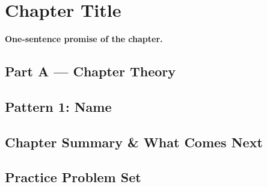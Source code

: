 %
\chapter{Chapter Title}
\label{ch:short}

\begin{tcolorbox}[enhanced, colback=white, colframe=secondaryblue, boxrule=1pt, arc=2mm]
\textbf{\large\textcolor{primaryblue}{One-sentence promise of the chapter.}}
\end{tcolorbox}


\chaptercontents   %

\section{Part A --- Chapter Theory}
% 

\clearpage
\section{Pattern 1: Name}
% 
% 
% 
% 


\clearpage
\section{Chapter Summary \& What Comes Next}
% 

\clearpage
\section{Practice Problem Set}
% 
% 
